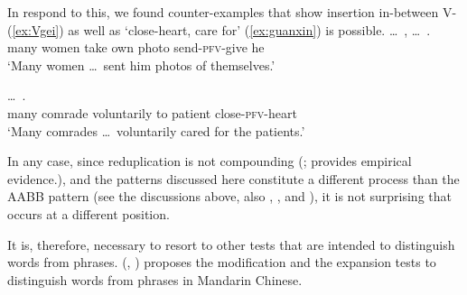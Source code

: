 \z\z

In respond to this, we found counter-examples that show  insertion in-between V- (\ref{ex:Vgei}) as well as  `close-heart, care for' (\ref{ex:guanxin}) is possible.
\ea\label{ex:Vgei}%
\gll \ldots\,  ,    \ldots\,  .\\
{} many women take own photo {} send-\textsc{pfv}-give he\\
\glt `Many women \ldots\, sent him photos of themselves.'
\z

\ea\label{ex:guanxin}%
\gll {}  \ldots\,    .\\
many comrade {} voluntarily to patient close-\textsc{pfv}-heart\\
\glt `Many comrades \ldots\, voluntarily cared for the patients.'
\z

In any case, since reduplication is not compounding (\citealt[149--150]{Sui2018}; \citealt{GaoEtAl2021} provides empirical evidence.),
and the patterns discussed here constitute a different process than the AABB pattern
(see the discussions above, also \citealt[Sec. 4.3]{Deng2013}, \citealt[Sec. 2]{SuiHu2016}, \citealt{Sui2018} and \citealt{Wang2023}),
it is not surprising that  occurs at a different position.

It is, therefore, necessary to resort to other tests that are intended to distinguish words from phrases. 
 \citeauthor{Dai1992} (\citeyear[32--33]{Dai1992}, \citeyear[117--120]{Dai1998}) proposes the modification and the expansion tests to distinguish words from phrases in Mandarin Chinese.


